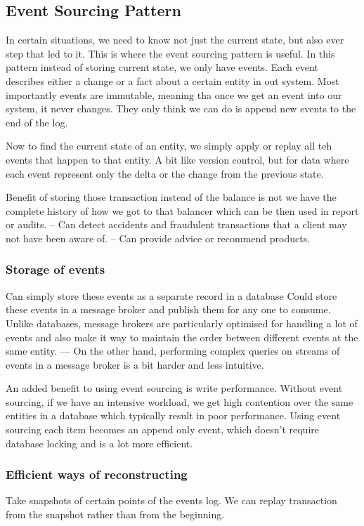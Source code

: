\documentclass[a4paper, 11pt]{book}
\begin{document}
    \subsection{Event Sourcing Pattern}
    In certain situations, we need to know not just the current state, but also ever step that led to it.
    This is where the event sourcing pattern is useful.
    In this pattern instead of storing current state, we only have events.
    Each event describes either a change or a fact about a certain entity in out system.
    Most importantly events are immutable, meaning tha once we get an event into our system, it never changes.
    They only think we can do is append new events to the end of the log.

    Now to find the current state of an entity, we simply apply or replay all teh events that happen to that entity.
    A bit like version control, but for data where each event represent only the delta or the change from the previous state.

    Benefit of storing those transaction instead of the balance is not we have the complete history of how we got to that balancer which can be then used in report or audits.
    -- Can detect accidents and fraudulent transactions that a client may not have been aware of.
    -- Can provide advice or recommend products.

    \subsubsection{Storage of events}
    Can simply store these events as a separate record in a database
    Could store these events in a message broker and publish them for any one to consume.
    Unlike databases, message brokers are particularly optimised for handling a lot of events and also make it way to maintain the order between different events at the same entity.
    --- On the other hand, performing complex queries on streams of events in a message broker is a bit harder and less intuitive.

    An added benefit to using event sourcing is write performance.
    Without event sourcing, if we have an intensive workload, we get high contention over the same entities in a database which typically result in poor performance.
    Using event sourcing each item becomes an append only event, which doesn't require database locking and is a lot more efficient.

    \subsubsection{Efficient ways of reconstructing}
    Take snapshots of certain points of the events log.
    We can replay transaction from the snapshot rather than from the beginning.
\end{document}

